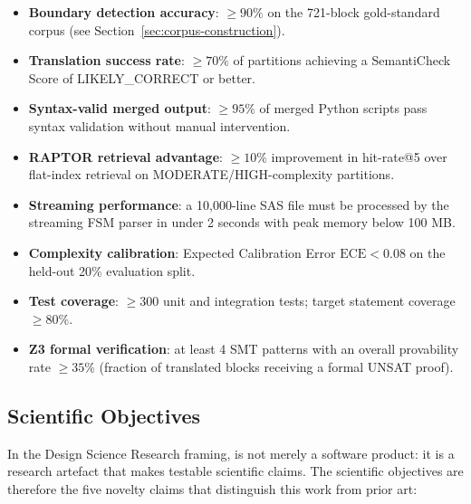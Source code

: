 \begin{itemize}
  \item \textbf{Boundary detection accuracy}: $\geq 90\%$ on the 721-block
    gold-standard corpus (see Section~\ref{sec:corpus-construction}).
  \item \textbf{Translation success rate}: $\geq 70\%$ of partitions achieving
    a SemantiCheck Score of LIKELY\_CORRECT or better.
  \item \textbf{Syntax-valid merged output}: $\geq 95\%$ of merged Python
    scripts pass syntax validation without manual intervention.
  \item \textbf{RAPTOR retrieval advantage}: $\geq 10\%$ improvement in
    hit-rate@5 over flat-index retrieval on MODERATE/HIGH-complexity partitions.
  \item \textbf{Streaming performance}: a 10,000-line SAS file must be
    processed by the streaming FSM parser in under 2 seconds with peak memory
    below 100 MB.
  \item \textbf{Complexity calibration}: Expected Calibration Error
    $\mathrm{ECE} < 0.08$ on the held-out 20\% evaluation split.
  \item \textbf{Test coverage}: $\geq 300$ unit and integration tests; target
    statement coverage $\geq 80\%$.
  \item \textbf{Z3 formal verification}: at least 4 SMT patterns with an overall
    provability rate $\geq 35\%$ (fraction of translated blocks receiving a formal
    UNSAT proof).
\end{itemize}

\subsection{Scientific Objectives}
\label{subsec:scientific-objectives}

In the Design Science Research framing, \codara{} is not merely a software
product: it is a research artefact that makes testable scientific claims.
The scientific objectives are therefore the five novelty claims that distinguish
this work from prior art:

